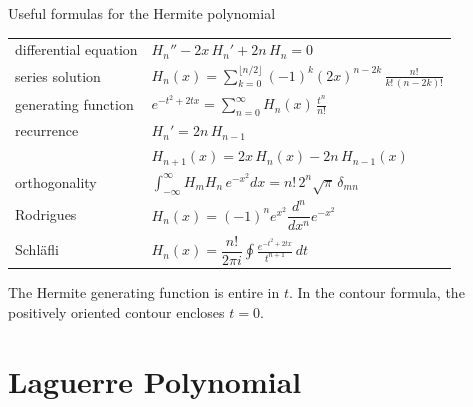 \documentclass[11pt]{beamer}
\begin{document}
\begin{frame}{Useful formulas for the Hermite polynomial}
\footnotesize
\begin{center}
\renewcommand{\arraystretch}{1.7}
\begin{tabular}{ll}
differential equation
  & $H_n'' - 2x\,H_n' + 2n\,H_n = 0$ \\
series solution
  & $H_n(x)=\displaystyle\sum_{k=0}^{\lfloor n/2\rfloor}
       (-1)^k(2x)^{n-2k}\,\frac{n!}{k!\,(n-2k)!}$ \\
generating function
  & $e^{-t^2+2tx} = \displaystyle\sum_{n=0}^{\infty}H_n(x)\,\frac{t^n}{n!}$ \\
recurrence
  & $H_n' = 2n\,H_{n-1}$ \\
  & $H_{n+1}(x) = 2x\,H_n(x) - 2n\,H_{n-1}(x)$ \\
orthogonality
  & $\displaystyle\int_{-\infty}^{\infty}H_mH_n\,e^{-x^2}dx
       = n!\,2^n\sqrt{\pi}\,\delta_{mn}$ \\
Rodrigues
  & $H_n(x)=(-1)^ne^{x^2}\dfrac{d^n}{dx^n}e^{-x^2}$ \\
Schl\"afli
  & $H_n(x)=\dfrac{n!}{2\pi i}
       \displaystyle\oint\frac{e^{-t^2+2tx}}{t^{n+1}}\,dt$
\end{tabular}
\end{center}
\vspace{0.2em}
{\scriptsize The Hermite generating function is entire in $t$.  In the
contour formula, the positively oriented contour encloses $t=0$.}
\end{frame}

\section{Laguerre Polynomial}
\end{document}
